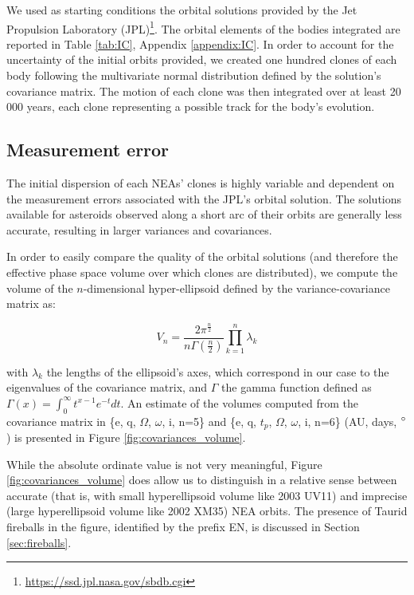 \documentclass[letters,a4paper,fleqn,usenatbib]{mnras}
\begin{document}
We used as starting conditions the orbital solutions provided by the Jet Propulsion Laboratory (JPL)\footnote{\url{https://ssd.jpl.nasa.gov/sbdb.cgi}}. The orbital elements of the bodies integrated are reported in Table \ref{tab:IC}, Appendix \ref{appendix:IC}.  In order to account for the uncertainty of the initial orbits provided, we created one hundred clones of each body following the multivariate normal distribution defined by the solution's covariance matrix. The motion of each clone was then integrated over at least 20 000 years, each clone representing a possible track for the body's evolution. 

\subsection{Measurement error}\label{sec:errors}

The initial dispersion of each NEAs' clones is highly variable and dependent on the measurement errors associated with the JPL's orbital solution. The solutions available for asteroids observed along a short arc of their orbits are generally less accurate, resulting in larger variances and covariances.

In order to easily compare the quality of the orbital solutions (and therefore the effective phase space volume over which clones are distributed), we compute the volume of the $n$-dimensional hyper-ellipsoid defined by the variance-covariance matrix as: 

\begin{equation}
    V_n=\frac{2\pi^\frac{n}{2}}{n\Gamma(\frac{n}{2})}\prod_{k=1}^{n}\lambda_k
\end{equation}

with $\lambda_k$ the lengths of the ellipsoid's axes, which correspond in our case to the eigenvalues of the covariance matrix, and $\Gamma$ the gamma function defined as $\Gamma(x)=\int_{0}^{\infty}t^{x-1}e^{-t}dt$. An estimate of the volumes computed from the covariance matrix in \{e, q, $\Omega$, $\omega$, i, n=5\} and \{e, q, ${t_p}$, $\Omega$, $\omega$, i, n=6\} (AU, days, $\degree$) is presented in Figure \ref{fig:covariances_volume}. 

While the absolute ordinate value is not very meaningful, Figure \ref{fig:covariances_volume} does allow us to distinguish in a relative sense between accurate (that is, with small hyperellipsoid volume like 2003 UV11) and imprecise (large hyperellipsoid volume like 2002 XM35) NEA orbits. The presence of Taurid fireballs in the figure, identified by the prefix EN, is discussed in Section \ref{sec:fireballs}. 
\end{document}
